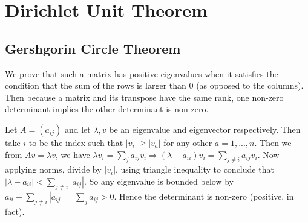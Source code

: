 \documentclass[11pt]{amsart}
\theoremstyle{named}
\begin{document}
\section{Dirichlet Unit Theorem}
\subsection{Gershgorin Circle Theorem} We prove that such a matrix has positive eigenvalues when it satisfies the condition that the sum of the rows is larger than $0$ (as opposed to the columns). Then because a matrix and its transpose have the same rank, one non-zero determinant implies the other determinant is non-zero.

Let $A = (a_{ij})$ and let $\lambda, v$ be an eigenvalue and eigenvector respectively. Then take $i$ to be the index such that $|v_i| \geq |v_a|$ for any other $a = 1, ..., n$. Then we from $Av = \lambda v$, we have $\lambda v_i = \sum_j a_{ij} v_i \Rightarrow (\lambda - a_{ii}) v_i = \sum_{j \neq i} a_{ij} v_i$. Now applying norms, divide by $|v_i|$, using triangle inequality to conclude that $|\lambda - a_{ii}| < \sum_{j \neq i} |a_{ij}|.$ So any eigenvalue is bounded below by $a_{ii} - \sum_{j \neq i} |a_{ij}| = \sum_j a_{ij} > 0.$ Hence the determinant is non-zero (positive, in fact).
\end{document}

